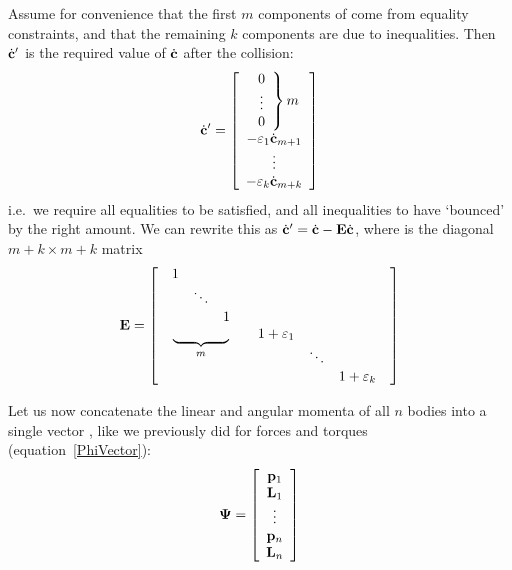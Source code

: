 Assume for convenience that the first $m$ components of  come from equality constraints, and
that the remaining $k$ components are due to inequalities.
Then $\dot{\ve{c}}'$ is the required value of $\dot{\ve{c}}$ after the collision:
\begin{equation}
\dot{\ve{c}}' = \left[\begin{array}[m]{c}
    \left. \begin{array}{c} 0 \\\vdots\\ 0 \end{array} \right\} m \\
    -\varepsilon_1 \dot{\ve{c}}_{m+1} \\\vdots\\
    -\varepsilon_k \dot{\ve{c}}_{m+k}
    \end{array}\right]
\end{equation}
i.e.\ we require all equalities to be satisfied, and all inequalities to have `bounced' by the
right amount. We can rewrite this as $\dot{\ve{c}}' = \dot{\ve{c}} - \m{E}\dot{\ve{c}}$, where
 is the diagonal $m+k \times m+k$ matrix
\begin{equation}
\m{E} = \left[ \begin{array}{cc}
    \begin{array}{ccc} 1 \\ & \ddots \\ && 1 \end{array} \\
    \underbrace{\quad\quad\quad\quad}_m &
    \begin{array}[t]{ccc} 1+\varepsilon_1 \\ & \ddots \\ && 1+\varepsilon_k \end{array}
    \end{array} \right]
\end{equation}

Let us now concatenate the linear and angular momenta of all $n$ bodies into a single vector
\ve{\Psi}, like we previously did for forces and torques (equation~\ref{PhiVector}):
\begin{equation} \label{PsiVector}
\ve{\Psi} = \left[\begin{array}{c}
    \ve{p}_1 \\ \ve{L}_1 \\ \vdots \\ \ve{p}_n \\ \ve{L}_n \end{array}\right]
\end{equation}

